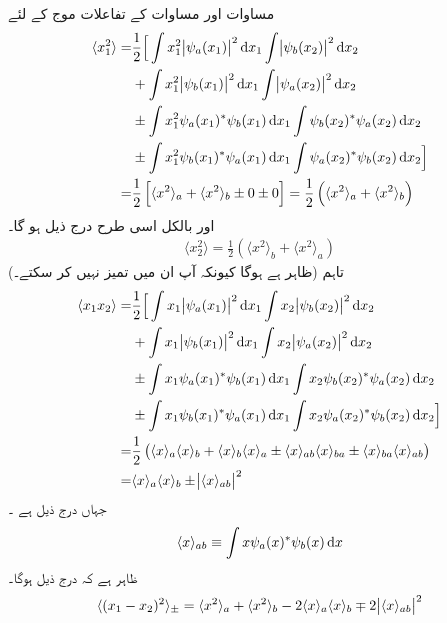  مساوات   اور  مساوات   کے تفاعلات موج کے لئے 
\begin{gather*}
	\begin{aligned}
		\langle x_1^2 \rangle =& \frac{1}{2}\Big[\int x_1^2\abs{\psi_a(x_1)}^2\dif x_1\int\abs{\psi_b(x_2)}^2\dif x_2 \\
		&+ \int x_1^2\abs{\psi_b(x_1)}^2\dif x_1\int\abs{\psi_a(x_2)}^2\dif x_2 \\
		&\pm\int x_1^2\psi_a(x_1)^*\psi_b(x_1)\dif x_1\int\psi_b(x_2)^*\psi_a(x_2)\dif x_2 \\
		&\pm\int x_1^2\psi_b(x_1)^*\psi_a(x_1)\dif x_1\int\psi_a(x_2)^*\psi_b(x_2)\dif x_2\Big] \\
		=& \frac{1}{2}\left[\langle x^2 \rangle_a+\langle x^2 \rangle_b\pm0\pm0\right]=\frac{1}{2}\left(\langle x^2 \rangle_a+\langle x^2\rangle_b\right)
	\end{aligned}
\end{gather*}
اور بالکل اسی طرح درج ذیل ہو گا۔
\begin{align*}
	\langle x_2^2 \rangle=\frac{1}{2}\left(\langle x^2 \rangle_b+\langle x^2 \rangle_a\right)
\end{align*}
(ظاہر ہے  ہوگا کیونکہ آپ ان میں تمیز نہیں کر سکتے۔)   تاہم
\begin{gather*}
	\begin{aligned}
		\langle x_1x_2 \rangle=&\frac{1}{2}\Big[\int x_1\abs{\psi_a(x_1)}^2\dif x_1\int x_2\abs{\psi_b(x_2)}^2\dif x_2 \\
		&+\int x_1\abs{\psi_b(x_1)}^2\dif x_1\int x_2\abs{\psi_a(x_2)}^2\dif x_2 \\
		&\pm\int x_1\psi_a(x_1)^*\psi_b(x_1)\dif x_1\int x_2\psi_b(x_2)^*\psi_a(x_2)\dif x_2 \\
		&\pm\int x_1\psi_b(x_1)^*\psi_a(x_1)\dif x_1\int x_2\psi_a(x_2)^*\psi_b(x_2)\dif x_2\Big] \\
		=& \frac{1}{2}\left(\langle x \rangle_a\langle x \rangle_b+\langle x \rangle_b\langle x \rangle_a\pm\langle x \rangle_{ab}\langle x \rangle_{ba}\pm\langle x \rangle_{ba}\langle x \rangle_{ab}\right)\\
		=&\langle x \rangle_a\langle x \rangle_b\pm\abs{\langle x \rangle_{ab}}^2
	\end{aligned}
\end{gather*}
 جہاں درج ذیل ہے ۔
\begin{align}\label{مساوات_متماثل_کے_بیچ}
	\langle x \rangle_{ab}\equiv\int x\psi_a(x)^*\psi_b(x)\dif x
\end{align}
ظاہر ہے کہ درج ذیل ہوگا۔
\begin{align}\label{مساوات_متماثل_فاصلہ_متماثل}
	\langle(x_1-x_2)^2\rangle_{\pm}=\langle x^2\rangle_a+\langle x^2 \rangle_b-2\langle x \rangle_a\langle x \rangle_b\mp2\abs{\langle x \rangle_{ab}}^2
\end{align}

